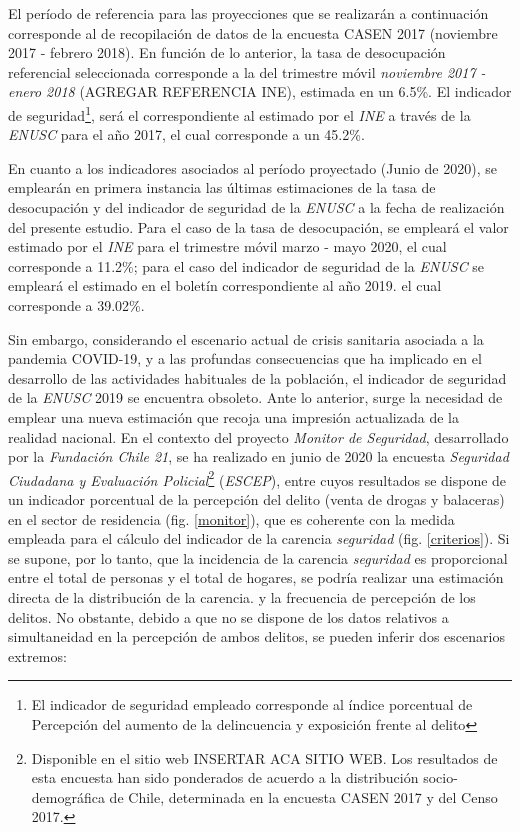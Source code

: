 \documentclass[12pt,letterpaper,spanish]{article}
\begin{document}
El período de referencia para las proyecciones que se realizarán a continuación corresponde al de recopilación de datos de la encuesta CASEN 2017 (noviembre 2017 - febrero 2018). En función de lo anterior, la tasa de desocupación referencial seleccionada corresponde a la del trimestre móvil \textit{noviembre 2017 - enero 2018} (AGREGAR REFERENCIA INE), estimada en un 6.5\%. El indicador de seguridad\footnote{El indicador de seguridad empleado corresponde al índice porcentual de Percepción del aumento de la delincuencia y exposición frente al delito}, será el correspondiente al estimado por el \textit{INE} a través de la \textit{ENUSC} para el año 2017, el cual corresponde a un 45.2\%. 

En cuanto a los indicadores asociados al período proyectado (Junio de 2020), se emplearán en primera instancia las últimas estimaciones de la tasa de desocupación y del indicador de seguridad de la \textit{ENUSC} a la fecha de realización del presente estudio. Para el caso de la tasa de desocupación, se empleará el valor estimado por el \textit{INE} para el trimestre móvil marzo - mayo 2020, el cual corresponde a 11.2\%; para el caso del indicador de seguridad de la \textit{ENUSC} se empleará el estimado en el boletín correspondiente al año 2019. el cual corresponde a 39.02\%.

Sin embargo, considerando el escenario actual de crisis sanitaria asociada a la pandemia COVID-19, y a las  profundas consecuencias que ha implicado en el desarrollo de las actividades habituales de la población, el indicador de seguridad de la \textit{ENUSC} 2019 se encuentra obsoleto. Ante lo anterior, surge la necesidad de emplear una nueva estimación que recoja una impresión actualizada de la realidad nacional. En el contexto del proyecto \textit{Monitor de Seguridad}, desarrollado por la \textit{Fundación Chile 21}, se ha realizado en junio de 2020 la encuesta \textit{Seguridad Ciudadana y Evaluación Policial}\footnote{Disponible en el sitio web INSERTAR ACA SITIO WEB. Los resultados de esta encuesta han sido ponderados de acuerdo a la distribución socio-demográfica de Chile, determinada en la encuesta CASEN 2017 y del Censo 2017.} (\textit{ESCEP}), entre cuyos resultados se dispone de un indicador porcentual de la percepción del delito (venta de drogas y balaceras) en el sector de residencia (fig. \ref{monitor}), que es coherente con la medida empleada para el cálculo del indicador de la carencia \textit{seguridad} (fig. \ref{criterios}). Si se supone, por lo tanto, que la incidencia de la carencia \textit{seguridad} es proporcional entre el total de personas y el total de hogares, se podría realizar una estimación directa de la distribución de la carencia. y la frecuencia de percepción de los delitos. No obstante, debido a que no se dispone de los datos relativos a simultaneidad en la percepción de ambos delitos, se pueden inferir dos escenarios extremos: 
\end{document}
